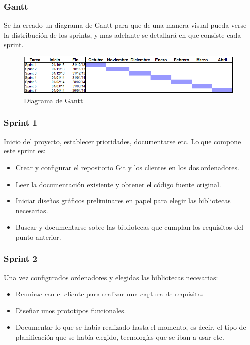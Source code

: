 \subsubsection{Gantt}
Se ha creado un diagrama de Gantt para que de una manera visual pueda
verse la distribuci\'on de los sprints, y mas adelante se detallar\'a
en que consiste cada sprint.

\begin{figure}[h]
\centering
\includegraphics[width=0.9\linewidth]{./Figures/Gantt.PNG}
\caption[Diagrama de Gantt]{Diagrama de Gantt}
\label{fig:Gantt}
\end{figure}

\subsubsection{Sprint 1}
Inicio del proyecto, establecer prioridades, documentarse etc. Lo que compone este sprint es:

\begin{itemize}
    \item Crear y configurar el repositorio Git y los clientes en los dos ordenadores.
    \item Leer la documentaci\'{o}n existente y obtener el c\'{o}digo fuente original.
    \item Iniciar dise\~{n}os gr\'{a}ficos preliminares en papel para elegir las bibliotecas 
    necesarias.
    \item Buscar y documentarse sobre las bibliotecas que cumplan los requisitos del punto 
    anterior. 
\end{itemize} 

\subsubsection{Sprint 2}
Una vez configurados ordenadores y elegidas las bibliotecas necesarias:

\begin{itemize}
    \item Reunirse con el cliente para realizar una captura de requisitos.
    \item Dise\~{n}ar unos prototipos funcionales.
    \item Documentar lo que se hab\'{i}a realizado hasta el momento, es decir, el tipo de 
    planificaci\'{o}n que se hab\'{i}a elegido,
    tecnolog\'{i}as que se iban a usar etc.
\end{itemize}

